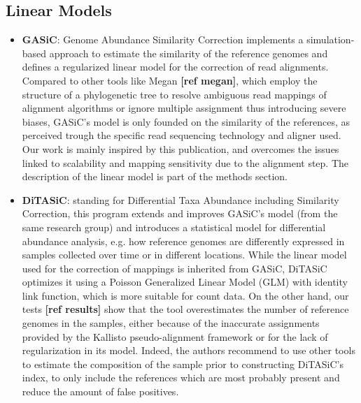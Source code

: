 \subsection{Linear Models}
\begin{itemize}
    \item \textbf{GASiC}: Genome Abundance Similarity Correction implements a simulation-based approach to estimate the similarity of the reference genomes and defines a regularized linear model for the correction of read alignments. Compared to other tools like Megan \textbf{[ref megan]}, which employ the structure of a phylogenetic tree to resolve ambiguous read mappings of alignment algorithms or ignore multiple assignment thus introducing severe biases, GASiC's model is only founded on the similarity of the references, as perceived trough the specific read sequencing technology and aligner used. Our work is mainly inspired by this publication, and overcomes the issues linked to scalability and mapping sensitivity due to the alignment step. The description of the linear model is part of the methods section.
    \item \textbf{DiTASiC}: standing for Differential Taxa Abundance including Similarity Correction, this program extends and improves GASiC's model (from the same research group) and introduces a statistical model for differential abundance analysis, e.g. how reference genomes are differently expressed in samples collected over time or in different locations. While the linear model used for the correction of mappings is inherited from GASiC, DiTASiC optimizes it using a Poisson Generalized Linear Model (GLM) with identity link function, which is more suitable for count data. On the other hand, our tests \textbf{[ref results]} show that the tool overestimates the number of reference genomes in the samples, either because of the inaccurate assignments provided by the Kallisto pseudo-alignment framework or for the lack of regularization in its model. Indeed, the authors recommend to use other tools to estimate the composition of the sample prior to constructing DiTASiC's index, to only include the references which are most probably present and reduce the amount of false positives.
\end{itemize}
